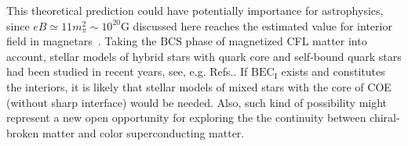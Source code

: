 \documentclass[prd, showpacs,nofootinbib,amsmath,amssymb,12pt]{revtex4}
\begin{document}
\begin{enumerate}[(i)]
This theoretical prediction could have potentially importance for astrophysics, since $eB\simeq 11m_\pi^2 \sim10^{20}\text{G}$ discussed here reaches the estimated value for interior field in magnetars~\cite{lai1991cold}. Taking the $\text{BCS}$ phase of magnetized CFL matter into account, stellar models of hybrid stars with quark core and self-bound quark stars had been studied in recent years, see, e.g. Refs.\cite{ferrer2013magnetism,paulucci2011equation}. 
If $\text{BEC}_\text{I}$ exists and constitutes the interiors, it is likely that stellar models of mixed stars with the core of COE
(without sharp interface) would be needed. Also, such kind of possibility might represent a new open opportunity for exploring the 
the continuity between chiral-broken matter and color superconducting matter.

\end{enumerate}
\end{document}
